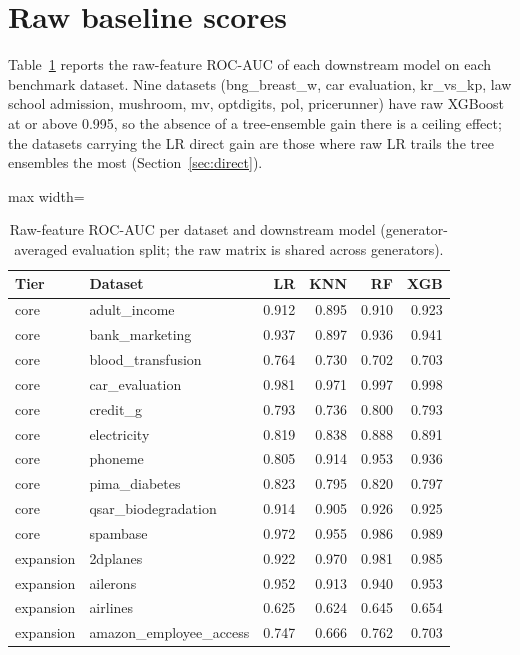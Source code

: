 \section{Raw baseline scores}\label{app:raw-scores}

Table~\ref{tab:raw-scores} reports the raw-feature ROC-AUC of each downstream model on each benchmark dataset. Nine datasets (bng\_breast\_w, car evaluation, kr\_vs\_kp, law school admission, mushroom, mv, optdigits, pol, pricerunner) have raw XGBoost at or above 0.995, so the absence of a tree-ensemble gain there is a ceiling effect; the datasets carrying the LR direct gain are those where raw LR trails the tree ensembles the most (Section~\ref{sec:direct}).


\begin{table}[htbp]
\caption{Raw-feature ROC-AUC per dataset and downstream model (generator-averaged evaluation split; the raw matrix is shared across generators).}\label{tab:raw-scores}
\centering
\scriptsize
\begin{adjustbox}{max width=\linewidth}
\begin{tabular}{llrrrr}
\toprule
Tier & Dataset & LR & KNN & RF & XGB \\
\midrule
core & adult\_income & 0.912 & 0.895 & 0.910 & 0.923 \\
core & bank\_marketing & 0.937 & 0.897 & 0.936 & 0.941 \\
core & blood\_transfusion & 0.764 & 0.730 & 0.702 & 0.703 \\
core & car\_evaluation & 0.981 & 0.971 & 0.997 & 0.998 \\
core & credit\_g & 0.793 & 0.736 & 0.800 & 0.793 \\
core & electricity & 0.819 & 0.838 & 0.888 & 0.891 \\
core & phoneme & 0.805 & 0.914 & 0.953 & 0.936 \\
core & pima\_diabetes & 0.823 & 0.795 & 0.820 & 0.797 \\
core & qsar\_biodegradation & 0.914 & 0.905 & 0.926 & 0.925 \\
core & spambase & 0.972 & 0.955 & 0.986 & 0.989 \\
\midrule
expansion & 2dplanes & 0.922 & 0.970 & 0.981 & 0.985 \\
expansion & ailerons & 0.952 & 0.913 & 0.940 & 0.953 \\
expansion & airlines & 0.625 & 0.624 & 0.645 & 0.654 \\
expansion & amazon\_employee\_access & 0.747 & 0.666 & 0.762 & 0.703 \\

\end{tabular}
\end{adjustbox}
\end{table}
